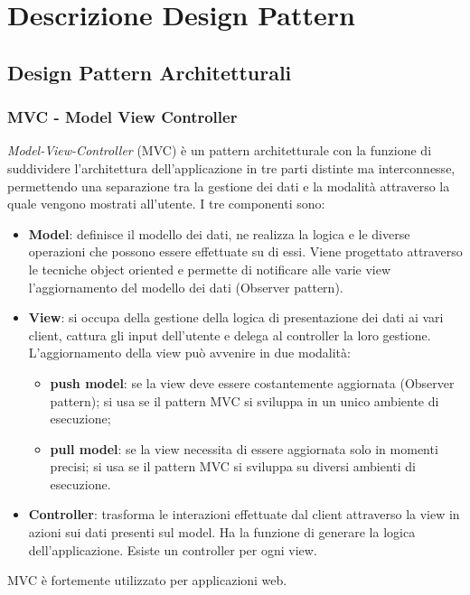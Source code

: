 \section{Descrizione Design Pattern} \label{app:design_pattern}

\subsection{Design Pattern Architetturali}

\subsubsection{MVC - Model View Controller}
\textit{Model-View-Controller} (MVC) è un pattern architetturale con la funzione di suddividere l'architettura dell'applicazione in tre parti distinte ma interconnesse, permettendo una separazione tra la gestione dei dati e la modalità attraverso la quale vengono mostrati all'utente.
I tre componenti sono:
\begin{itemize}
	\item \textbf{Model}: definisce il modello dei dati, ne realizza la logica e le diverse operazioni che possono essere effettuate su di essi. Viene progettato attraverso le tecniche object oriented e permette di notificare alle varie view l'aggiornamento del modello dei dati (Observer pattern).
	\item \textbf{View}: si occupa della gestione della logica di presentazione dei dati ai vari client, cattura gli input dell'utente e delega al controller la loro gestione. L'aggiornamento della view può avvenire in due modalità:
	\begin{itemize}
		\item \textbf{push model}: se la view deve essere costantemente aggiornata (Observer pattern); si usa se il pattern MVC si sviluppa in un unico ambiente di esecuzione;
		\item \textbf{pull model}: se la view necessita di essere aggiornata solo in momenti precisi; si usa se il pattern MVC si sviluppa su diversi ambienti di esecuzione.
	\end{itemize}
	\item \textbf{Controller}: trasforma le interazioni effettuate dal client attraverso la view in azioni sui dati presenti sul model. Ha la funzione di generare la logica dell'applicazione. Esiste un controller per ogni view.
\end{itemize}
MVC è fortemente utilizzato per applicazioni web.
